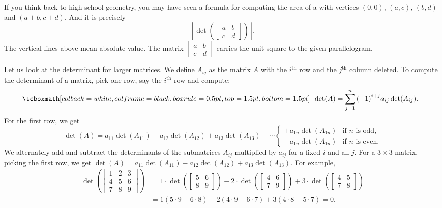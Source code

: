 If you think back to high school geometry, you may have seen a formula for
computing the area of a 
with vertices $(0,0)$, $(a,c)$, $(b,d)$
and $(a+b,c+d)$.  And it is precisely
\begin{equation*}
\left\lvert \, \det \left(
\begin{bmatrix} a & b \\ c & d \end{bmatrix}
\right) \, \right\rvert.
\end{equation*}
The vertical lines above mean absolute value.
The matrix $\left[ \begin{smallmatrix} a & b \\ c & d \end{smallmatrix}
\right]$
carries the unit square to the given parallelogram.

\medskip

Let us look at the determinant for larger matrices.  We define $A_{ij}$ as
the matrix $A$ with the $i^{\text{th}}$ row and the $j^{\text{th}}$ column
deleted.  To compute the determinant of a matrix, pick one row, say the
$i^{\text{th}}$ row and compute:
\begin{equation*}
\mybxbg{~~
\det (A) =
\sum_{j=1}^n
{(-1)}^{i+j}
a_{ij} \det (A_{ij}) .
~~}
\end{equation*}
For the first row, we get
\begin{equation*}
\det (A) =
a_{11} \det (A_{11}) - 
a_{12} \det (A_{12}) + 
a_{13} \det (A_{13}) - 
\cdots
\begin{cases}
+ a_{1n} \det (A_{1n}) & \text{if } n \text{ is odd,} \\
- a_{1n} \det (A_{1n}) & \text{if } n \text{ is even.}
\end{cases}
\end{equation*}
We alternately add and subtract the determinants of the submatrices
$A_{ij}$ multiplied by $a_{ij}$ for a fixed $i$ and all $j$.
For a $3 \times 3$ matrix,
picking the first row, we get $\det (A) = a_{11} \det (A_{11}) -
a_{12} \det (A_{12}) + a_{13} \det (A_{13})$.  For example,
\begin{equation*}
\begin{split}
\det \left(
\begin{bmatrix}
1 & 2 & 3 \\
4 & 5 & 6 \\
7 & 8 & 9
\end{bmatrix}
\right)
& =
1 \cdot
\det \left(
\begin{bmatrix}
5 & 6 \\
8 & 9
\end{bmatrix}
\right)
-
2 \cdot
\det \left(
\begin{bmatrix}
4 & 6 \\
7 & 9
\end{bmatrix}
\right)
+
3 \cdot
\det \left(
\begin{bmatrix}
4 & 5 \\
7 & 8
\end{bmatrix}
\right) \\
& =
1 (5 \cdot 9 - 6 \cdot 8)
-
2 (4 \cdot 9 - 6 \cdot 7)
+
3 (4 \cdot 8 - 5 \cdot 7)
= 0 .
\end{split}
\end{equation*}

